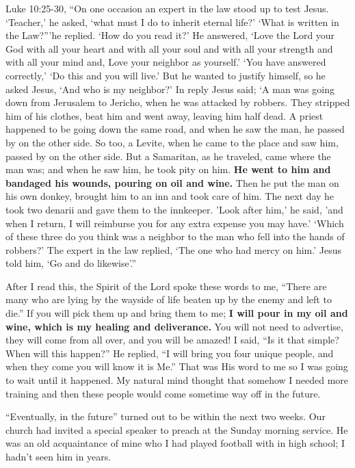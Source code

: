 \documentclass[twoside, 12pt]{book}
\begin{document}
Luke 10:25-30, “On one occasion an expert in the law stood up to test Jesus. ‘Teacher,’ he asked, ‘what must I do to inherit eternal life?’ ‘What is written in the Law?”’he replied. ‘How do you read it?’ He answered, ‘Love the Lord your God with all your heart and with all your soul and with all your strength and with all your mind and, Love your neighbor as yourself.' ‘You have answered correctly,’ ‘Do this and you will live.’ But he wanted to justify himself, so he asked Jesus, ‘And who is my neighbor?’ In reply Jesus said; ‘A man was going down from Jerusalem to Jericho, when he was attacked by robbers. They stripped him of his clothes, beat him and went away, leaving him half dead. A priest happened to be going down the same road, and when he saw the man, he passed by on the other side. So too, a Levite, when he came to the place and saw him, passed by on the other side. But a Samaritan, as he traveled, came where the man was; and when he saw him, he took pity on him. \textbf{He went to him and bandaged his wounds, pouring on oil and wine.} Then he put the man on his own donkey, brought him to an inn and took care of him. The next day he took two denarii and gave them to the innkeeper. 'Look after him,' he said, 'and when I return, I will reimburse you for any extra expense you may have.' ‘Which of these three do you think was a neighbor to the man who fell into the hands of robbers?’ The expert in the law replied, ‘The one who had mercy on him.’ Jesus told him, ‘Go and do likewise’.”

After I read this, the Spirit of the Lord spoke these words to me, “There are many who are lying by the wayside of life beaten up by the enemy and left to die.” If you will pick them up and bring them to me; \textbf{I will pour in my oil and wine, which is my healing and deliverance.} You will not need to advertise, they will come from all over, and you will be amazed! I said, “Is it that simple? When will this happen?” He replied, “I will bring you four unique people, and when they come you will know it is Me.” That was His word to me so I was going to wait until it happened. My natural mind thought that somehow I needed more training and then these people would come sometime way off in the future.

“Eventually, in the future” turned out to be within the next two weeks. Our church had invited a special speaker to preach at the Sunday morning service. He was an old acquaintance of mine who I had played football with in high school; I hadn't seen him in years. 
\end{document}
